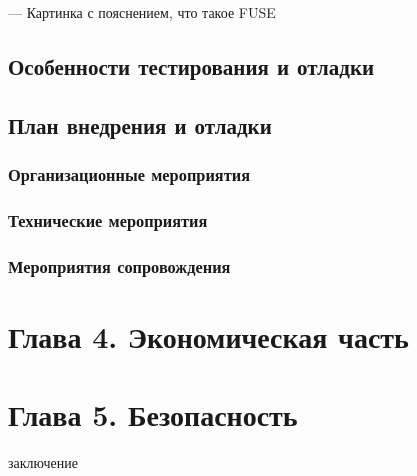 \documentclass[utf8,usehyperref,12pt]{G7-32}
\begin{document}
--- Картинка с пояснением, что такое FUSE
\section{Особенности тестирования и отладки}
\section{План внедрения и отладки}
\subsection{Организационные мероприятия}
\subsection{Технические мероприятия}
\subsection{Мероприятия сопровождения}

\chapter{Глава 4. Экономическая часть}
\chapter{Глава 5. Безопасность}

\Conclusion
заключение
\end{document}
